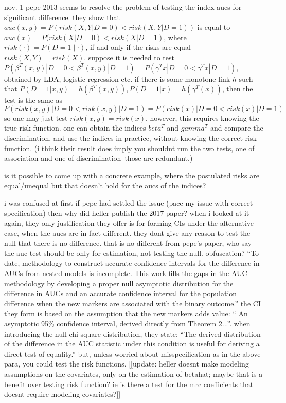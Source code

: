 \documentclass{article}
\begin{document}
nov. 1
pepe 2013 seems to resolve the problem of testing the index aucs for
significant difference. they show that
$auc(x,y)=P(risk(X,Y|D=0) < risk(X,Y|D=1))$ is equal to
$auc(x)=P(risk(X|D=0) < risk(X|D=1)$, where
$risk(\cdot)=P(D=1\mid \cdot)$, if and only if the risks are equal
$risk(X,Y)=risk(X)$. suppose it is needed to test
$P(\beta^T(x,y)|D=0 < \beta^T(x,y)|D=1)=P(\gamma^Tx|D=0 <
\gamma^Tx|D=1)$, obtained by LDA, logistic regression etc. if there is
some monotone link $h$ such that
$P(D=1|x,y)=h(\beta^T(x,y)),P(D=1|x)=h(\gamma^T(x))$, then the test is
the same as
$P(risk(x,y)|D=0 < risk(x,y)|D=1)=P(risk(x)|D=0 < risk(x)|D=1)$ so one
may just test $risk(x,y)=risk(x)$. however, this requires knowing the
true risk function. one can obtain the indices $beta^T$ and $gamma^T$
and compare the discrimination, and use the indices in practice,
without knowing the correct risk function. (i think their result does
imply you shouldnt run the two tests, one of association and one of
discrimination--those are redundant.)

is it possible to come up with a
concrete example, where the postulated risks are equal/unequal but
that doesn't hold for the aucs of the indices?

i was confused at first if pepe had settled the issue (pace my issue
with correct specification) then why did heller publish the 2017
paper? when i looked at it again, they only justification they offer
is for forming CIs under the alternative case, when the aucs are in
fact different. they dont give any reason to test the null that there
is no difference. that is no different from pepe's paper, who say the
auc test should be only for estimation, not testing the
null. obfuscation? ``To date, methodology to construct accurate
confidence intervals for the difference in AUCs from nested models is
incomplete. This work fills the gaps in the AUC methodology by
developing a proper null asymptotic distribution for the difference in
AUCs and an accurate confidence interval for the population difference
when the new markers are associated with the binary outcome.'' the CI
they form is based on the assumption that the new markers adds value:
`` An asymptotic 95\% confidence interval, derived directly from
Theorem 2...''. when introducing the null chi square distribution,
they state: ``The derived distribution of the difference in the AUC
statistic under this condition is useful for deriving a direct test of
equality.'' but, unless worried about misspecification as in the above
para, you could test the risk functions. [[update: heller doesnt make
modeling assumptions on the covariates, only on the estimation of
betahat; maybe that is a benefit over testing risk function? ie is
there a test for the mrc coefficients that doesnt require modeling
covariates?]]
\end{document}
